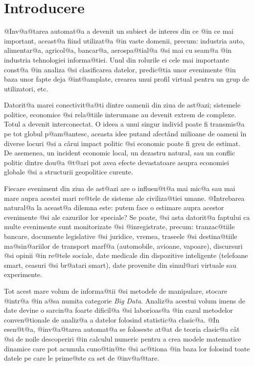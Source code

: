 

\chapter*{Introducere}
\label{capintro}

@Inv@a@tarea automat@a a devenit un subiect de interes din ce @in ce mai important, aceast@a fiind utilizat@a @in vaste domenii, precum: industria auto, alimentar@a, agricol@a, bancar@a, aerospa@tial@a @si mai cu seam@a @in industria tehnologiei informa@tiei. Unul din rolurile ei cele mai importante const@a @in analiza @si clasificarea datelor, predic@tia unor evenimente @in baza unor fapte deja @int@amplate, crearea unui profil virtual pentru un grup de utilizatori, etc.


Datorit@a marei conectivit@a@ti dintre oamenii din ziua de ast@azi; sistemele politice, economice @si rela@tiile interumane au devenit extrem de complexe. Totul a devenit interconectat. O ideea a unui singur individ poate fi transmis@a pe tot globul p@am@antesc, aceasta idee putand afect\^ and milioane de oameni \^ in diverse locuri @si a c\^ arui impact politic @si economic poate fi greu de estimat. De asemenea, un incident economic local, un dezastru natural, sau un conflic politic dintre dou@a @t@ari pot avea efecte devastatoare asupra economiei globale @si a structurii geopolitice curente.

Fiecare eveniment din ziua de ast@azi are o influen@t@a mai mic@a sau mai mare aupra acestei mari re@tele de sisteme ale civiliza@tiei umane. @Intrebarea natural@a la aceast@a dilemna este: putem face o estimare aupra acestor evenimente @si ale cazurilor lor speciale? Se poate, @si asta datorit@a faptului ca multe evenimente sunt monitorizate @si @inregistrate, precum: tranzac@tiile bancare, documente legislative @si juridice, vremea, traseele @si destina@tiile ma@sin@ariilor de transport marf@a (automobile, avioane, vapoare), discursuri @si opinii @in re@tele sociale, date medicale din dispozitive inteligente (telefoane smart, ceasuri @si br@atari smart), date provenite din simul@ari virtuale sau experimente. 

Tot acest mare volum de informa@tii @si metodele de manipulare, stocare @intr@a @in a@sa numita categorie {\sl Big Data}. Analiz@a acestui volum imens de date devine o sarcin@a foarte dificil@a @si laborioas@a @in cazul metodelor conven@tionale de analiz@a a datelor folosind statistic@a clasic@a. @In esen@t@a, @inv@a@tarea automat@a se foloseste at@at de teoria clasic@a c\^  at @si de noile descoperiri @in calculul numeric pentru a crea modele matematice dinamice care pot acumula cuno@tin@te @si ac@tiona @in baza lor folosind toate datele pe care le prime@ste ca set de @inv@a@tare.


